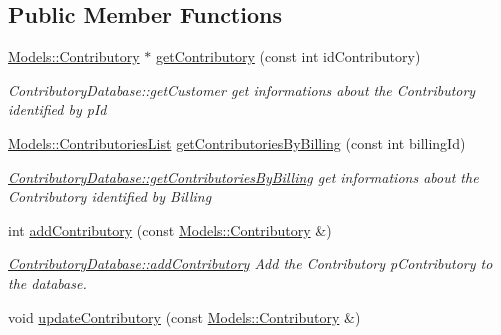 \subsection*{Public Member Functions}
\begin{DoxyCompactItemize}
\item 
\hyperlink{classModels_1_1Contributory}{Models\-::\-Contributory} $\ast$ \hyperlink{classDatabases_1_1ContributoryDatabase_a76b6541c4b770a51b8d1a449631a5ffd}{get\-Contributory} (const int id\-Contributory)
\begin{DoxyCompactList}\small\item\em Contributory\-Database\-::get\-Customer get informations about the Contributory identified by {\itshape p\-Id} \end{DoxyCompactList}\item 
\hyperlink{classModels_1_1ContributoriesList}{Models\-::\-Contributories\-List} \hyperlink{classDatabases_1_1ContributoryDatabase_afa10024c8a5afe7fd6c09a254357e5c2}{get\-Contributories\-By\-Billing} (const int billing\-Id)
\begin{DoxyCompactList}\small\item\em \hyperlink{classDatabases_1_1ContributoryDatabase_afa10024c8a5afe7fd6c09a254357e5c2}{Contributory\-Database\-::get\-Contributories\-By\-Billing} get informations about the Contributory identified by {\itshape Billing} \end{DoxyCompactList}\item 
int \hyperlink{classDatabases_1_1ContributoryDatabase_abd7bf49a62d8e267d898936122b5c2a7}{add\-Contributory} (const \hyperlink{classModels_1_1Contributory}{Models\-::\-Contributory} \&)
\begin{DoxyCompactList}\small\item\em \hyperlink{classDatabases_1_1ContributoryDatabase_abd7bf49a62d8e267d898936122b5c2a7}{Contributory\-Database\-::add\-Contributory} Add the Contributory {\itshape p\-Contributory} to the database. \end{DoxyCompactList}\item 
\hypertarget{classDatabases_1_1ContributoryDatabase_a748062c6793dd80115ded9bffba75b6a}{void \hyperlink{classDatabases_1_1ContributoryDatabase_a748062c6793dd80115ded9bffba75b6a}{update\-Contributory} (const \hyperlink{classModels_1_1Contributory}{Models\-::\-Contributory} \&)}\label{classDatabases_1_1ContributoryDatabase_a748062c6793dd80115ded9bffba75b6a}


\end{DoxyCompactItemize}
